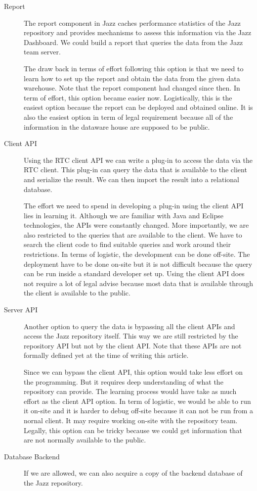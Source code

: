 \begin{description}
\item[Report]
The report component in Jazz caches performance statistics of the Jazz repository
and provides mechanisms to assess this information via the Jazz Dashboard. We
could build a report that queries the data from the Jazz team server.

The draw back in terms of effort following this option is that we need to learn
how to set up the report and obtain the data from the given data warehouse. Note
that the report component had changed since then. In term of effort, this option
became easier now. Logistically, this is the easiest option because the report
can be deployed and obtained online. It is also the easiest option in term of
legal requirement because all of the information in the dataware house are
supposed to be public. \item[Client API] Using the RTC client API we can write a
plug-in to access the data via the RTC client. This plug-in can query  the data
that is available to the client and serialize the result. We can then import the
result into a relational database.

The effort we need to spend in developing a plug-in using the client API lies in
learning it. Although we are familiar with Java and Eclipse technologies, the
APIs were constantly changed. More importantly, we are also restricted to the queries
that are available to the client. We have to search the client code to find
suitable queries and work around their restrictions. In terms of logistic, the
development can be done off-site. The deployment have to be done on-site but it
is not difficult because the query can be run inside a standard developer set up.
Using the client API does not require a lot of legal advise because most data
that is available through the client is available to the public.

\item[Server API] Another option to query the data is bypassing all the client
APIs and access the Jazz repository itself. This way we are still restricted
by the repository API but not by the client API. Note that these APIs are not formally
defined yet at the time of writing this article.

Since we can bypass the client API, this option would take less effort on the
programming. But it requires deep understanding of what the repository can
provide. The learning process would have take as much effort as the client API
option. In term of logistic, we would be able to run it on-site and it is harder
to debug off-site because it can not be run from a nornal client. It may require
working on-site with the repository team. Legally, this option can be tricky
because we could get information that are not normally available to the public.
\item[Database Backend] If we are allowed, we can also acquire a copy of the
backend database of the Jazz repository.


\end{description}
